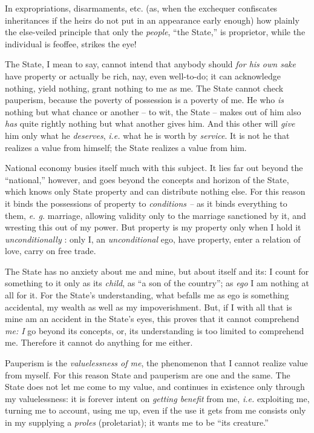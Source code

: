 \documentclass[12pt,a4paper]{book}
\begin{document}
In expropriations, disarmaments, etc. (as, when the exchequer confiscates 
inheritances if the heirs do not put in an appearance early enough) how 
plainly the else-veiled principle that only the \textit{people}, ``the 
State,'' is proprietor, while the individual is feoffee, strikes the eye!

The State, I mean to say, cannot intend that anybody should \textit{for his 
own sake} have property or actually be rich, nay, even well-to-do; it can 
acknowledge nothing, yield nothing, grant nothing to me as me. The State 
cannot check pauperism, because the poverty of possession is a poverty of me. 
He who \textit{is} nothing but what chance or another -- to wit, the State -- 
makes out of him also \textit{has} quite rightly nothing but what another 
gives him. And this other will \textit{give} him only what he 
\textit{deserves}, \textit{i.e.} what he is worth by \textit{service}. It is 
not he that realizes a value from himself; the State realizes a value from 
him.

National economy busies itself much with this subject. It lies far out beyond 
the ``national,'' however, and goes beyond the concepts and horizon of the 
State, which knows only State property and can distribute nothing else. For 
this reason it binds the possessions of property to \textit{conditions --} as 
it binds everything to them, \textit{e. g.} marriage, allowing validity only 
to the marriage sanctioned by it, and wresting this out of my power. But 
property is my property only when I hold it \textit{unconditionally} : only I, 
an \textit{unconditional} ego, have property, enter a relation of love, carry 
on free trade.

The State has no anxiety about me and mine, but about itself and its: I count 
for something to it only as its \textit{child}, as ``a son of the country''; 
as \textit{ego} I am nothing at all for it. For the State's understanding, 
what befalls me as ego is something accidental, my wealth as well as my 
impoverishment. But, if I with all that is mine am an accident in the State's 
eyes, this proves that it cannot comprehend \textit{me: I} go beyond its 
concepts, or, its understanding is too limited to comprehend me. Therefore it 
cannot do anything for me either.

Pauperism is the \textit{valuelessness of me}, the phenomenon that I cannot 
realize value from myself. For this reason State and pauperism are one and the 
same. The State does not let me come to my value, and continues in existence 
only through my valuelessness: it is forever intent on \textit{getting 
benefit} from me, \textit{i.e.} exploiting me, turning me to account, using me 
up, even if the use it gets from me consists only in my supplying a 
\textit{proles} (proletariat); it wants me to be ``its creature.''
\end{document}

